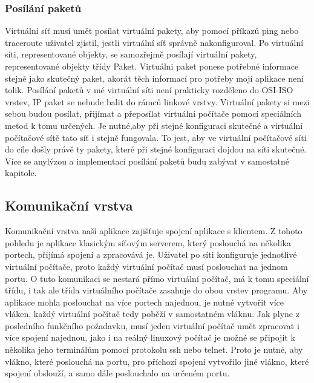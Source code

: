 \subsubsection{Posílání paketů}
Virtuální síť musí umět posílat virtuální pakety, aby pomocí příkazů ping nebo traceroute uživatel zjistil, jestli virtuální síť správně nakonfiguroval. Po virtuální síti, representované objekty, se samozřejmě posílají virtuální pakety, representované objekty třídy Paket. Virtuálni paket ponese potřebné informace stejně jako skutečný paket, akorát těch informací pro potřeby mojí aplikace není tolik. Posílání paketů v mé virtuální síti není prakticky rozděleno do OSI-ISO vrstev, IP paket se nebude balit do rámců linkové vrstvy. Virtuální pakety si mezi sebou budou posílat, přijímat a přeposílat virtuální počítače pomocí speciálních metod k tomu určených. Je nutné,aby při stejné konfiguraci skutečné a virtuální počítačové sítě tato síť i stejně fungovala. To jest, aby ve virtuální počítačové síti do cíle došly právě ty pakety, které při stejné konfiguraci dojdou na síti skutečné. Více se anylýzou a implementací posílání paketů budu zabývat v samostatné kapitole.

\subsection{Komunikační vrstva}
Komunikační vrstva naší aplikace zajišťuje spojení aplikace s klientem. Z tohoto pohledu je aplikace klasickým síťovým serverem, který poslouchá na několika portech, přijímá spojení a zpracovává je. Uživatel po síti konfiguruje jednotlivé virtuální počítače, proto každý virtuální počítač musí poslouchat na jednom portu. O tuto komunikaci se nestará přímo virtuální počítač, má k tomu speciální třídu, i tak ale třída virtuálního počítače zasahuje do obou vrstev programu. Aby aplikace mohla poslouchat na více portech najednou, je nutné vytvořit více vláken, každý virtuální počítač tedy poběží v samostatném vláknu. Jak plyne z posledního funkčního požadavku, musí jeden virtuální počítač umět zpracovat i více spojení najednou, jako i na reálný linuxový počítač je možné se připojit k několika jeho terminálům pomocí protokolu ssh nebo telnet. Proto je nutné, aby vlákno, které poslouchá na portu, pro příchozí spojení vytvořilo jiné vlákno, které spojení obslouží, a samo dále poslouchalo na určeném portu. 

  